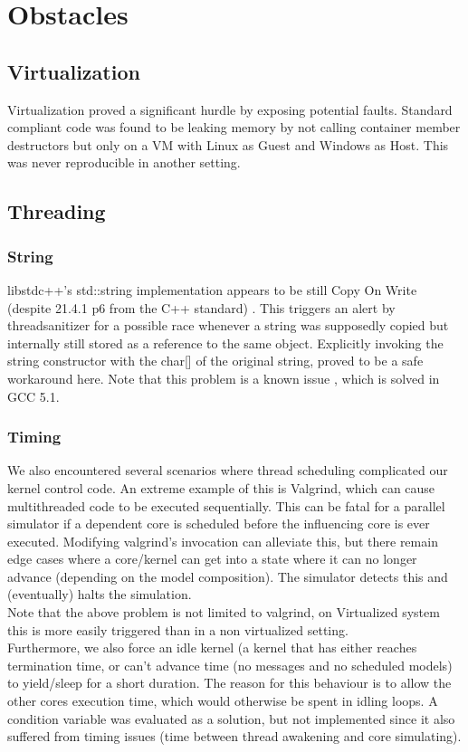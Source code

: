 \documentclass[8pt,a4paper]{report}
\begin{document}
\chapter{Obstacles}
\section{Virtualization}
Virtualization proved a significant hurdle by exposing potential faults. Standard compliant code was found to be leaking memory by not calling container member destructors but only on a VM with Linux as Guest and Windows as Host. This was never reproducible in another setting.
\section{Threading}
\subsection{String}
libstdc++'s std::string implementation appears to be still Copy On Write (despite 21.4.1 p6 from the C++ standard) \cite{cpp}. This triggers an alert by threadsanitizer for a possible race whenever a string was supposedly copied but internally still stored as a reference to the same object. Explicitly invoking the string constructor with the char[] of the original string, proved to be a safe workaround here. Note that this problem is a known issue \cite{cow}, which is solved in GCC 5.1.\\
\subsection{Timing}
We also encountered several scenarios where thread scheduling complicated our kernel control code. An extreme example of this is Valgrind, which can cause multithreaded code to be executed sequentially. This can be fatal for a parallel simulator if a dependent core is scheduled before the influencing core is ever executed. Modifying valgrind's invocation can alleviate this, but there remain edge cases where a core/kernel can get into a state where it can no longer advance (depending on the model composition). The simulator detects this and (eventually) halts the simulation. \\ Note that the above problem is not limited to valgrind, on Virtualized system this is more easily triggered than in a non virtualized setting.\\
Furthermore, we also force an idle kernel (a kernel that has either reaches termination time, or can't advance time (no messages and no scheduled models) to yield/sleep for a short duration. The reason for this behaviour is to allow the other cores execution time, which would otherwise be spent in idling loops. A condition variable was evaluated as a solution, but not implemented since it also suffered from timing issues (time between thread awakening and core simulating).
\end{document}

